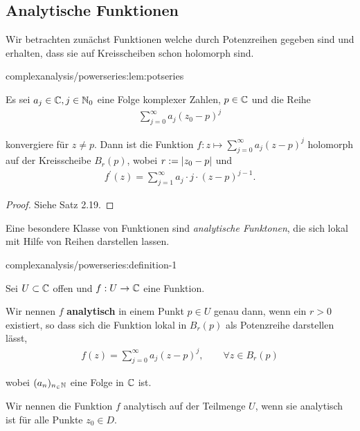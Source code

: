 \subsection{Analytische Funktionen}
\label{\detokenize{complexanalysis/powerseries:analytische-funktionen}}
\par
Wir betrachten zunächst Funktionen welche durch Potenzreihen gegeben sind und erhalten, dass sie auf Kreisscheiben schon holomorph sind.
\begin{lemma}{}{complexanalysis/powerseries:lem:potseries}



\par
Es sei \(a_j\in\mathbb{C}, j\in\mathbb{N}_0\) eine Folge komplexer Zahlen, \(p\in\mathbb{C}\) und die Reihe
\begin{align*}
\sum_{j=0}^\infty a_j (z_0-p)^j\end{align*}
\par
konvergiere für \(z\neq p\). Dann ist die Funktion \(f:z\mapsto \sum_{j=0}^\infty a_j (z-p)^j\) holomorph auf der Kreisscheibe \(B_r(p)\), wobei \(r:=\vert z_0-p \vert\) und
\begin{align*}
f^\prime(z) = \sum_{j=1}^\infty a_j\cdot j\cdot (z-p)^{j-1}.
\end{align*}\end{lemma}

\begin{proof}
 Siehe \cite{Nee17} Satz 2.19.
\end{proof}

\par
Eine besondere Klasse von Funktionen sind \emph{analytische Funktonen}, die sich lokal mit Hilfe von Reihen darstellen lassen.
\begin{definition}{}{complexanalysis/powerseries:definition-1}



\par
Sei \(U \subset \mathbb{C}\) offen und \(f: U\to \mathbb{C}\) eine Funktion.

\par
Wir nennen \(f\) \textbf{analytisch} in einem Punkt \(p \in U\) genau dann, wenn ein \(r > 0\) existiert, so dass sich die Funktion lokal in \(B_r(p)\) als Potenzreihe darstellen lässt,
\begin{align*}
f(z) = \sum_{j=0}^\infty a_j (z-p)^j, \qquad \forall z\in B_r(p)
\end{align*}
\par
wobei \((a_n)_{n_\in\mathbb{N}}\) eine Folge in \(\mathbb{C}\) ist.

\par
Wir nennen die Funktion \(f\) analytisch auf der Teilmenge \(U\), wenn sie analytisch ist für alle Punkte \(z_0 \in D\).
\end{definition}

